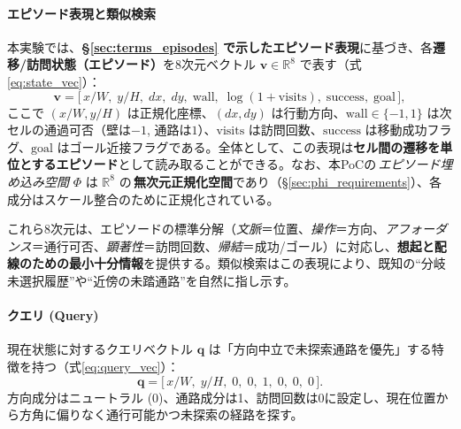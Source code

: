 \documentclass[ja=standard,xelatex]{bxjsarticle}
\begin{document}
\paragraph{エピソード表現と類似検索}
本実験では、\textbf{§\ref{sec:terms_episodes} で示したエピソード表現}に基づき、各\textbf{遷移/訪問状態（エピソード）}を8次元ベクトル $\mathbf{v} \in \mathbb{R}^8$ で表す（式\ref{eq:state_vec}）：
\begin{equation}
  \mathbf{v}=\big[\,x/W,\; y/H,\; dx,\; dy,\; \mathrm{wall},\; \log(1{+}\mathrm{visits}),\; \mathrm{success},\; \mathrm{goal}\,\big],\label{eq:state_vec}
\end{equation}
 ここで $(x/W, y/H)$ は正規化座標、$(dx, dy)$ は行動方向、$\mathrm{wall}\in\{-1,1\}$ は次セルの通過可否（壁は$-1$, 通路は$1$）、$\mathrm{visits}$ は訪問回数、$\mathrm{success}$ は移動成功フラグ、$\mathrm{goal}$ はゴール近接フラグである。全体として、この表現は\textbf{セル間の遷移を単位とするエピソード}として読み取ることができる。なお、本PoCの\,\emph{エピソード埋め込み空間} $\Phi$ は $\mathbb{R}^8$ の\,\textbf{無次元正規化空間}であり（§\ref{sec:phi_requirements}）、各成分はスケール整合のために正規化されている。

\noindent これら8次元は、エピソードの標準分解（\emph{文脈}＝位置、\emph{操作}＝方向、\emph{アフォーダンス}＝通行可否、\emph{顕著性}＝訪問回数、\emph{帰結}＝成功/ゴール）に対応し、\textbf{想起と配線のための最小十分情報}を提供する。類似検索はこの表現により、既知の“分岐未選択履歴”や“近傍の未踏通路”を自然に指し示す。

\paragraph{クエリ (Query)}
現在状態に対するクエリベクトル $\mathbf{q}$ は「方向中立で未探索通路を優先」する特徴を持つ（式\ref{eq:query_vec}）：
\begin{equation}
  \mathbf{q}=\big[\,x/W,\; y/H,\; 0,\; 0,\; 1,\; 0,\; 0,\; 0\,\big].\label{eq:query_vec}
\end{equation}
方向成分はニュートラル (0)、通路成分は1、訪問回数は0に設定し、現在位置から方角に偏りなく通行可能かつ未探索の経路を探す。
\end{document}

